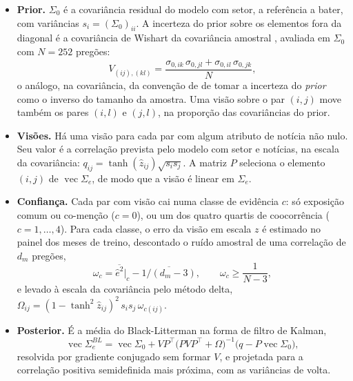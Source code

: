 \begin{itemize}
  \item \textbf{Prior.} $\Sigma_0$ é a covariância residual do modelo com setor, a referência a bater,
        com variâncias $s_i=(\Sigma_0)_{ii}$. A incerteza do prior sobre os elementos fora da diagonal é
        a covariância de Wishart da covariância amostral \citep{anderson2003}, avaliada em $\Sigma_0$
        com $N=252$ pregões:
        \begin{equation}
          V_{(ij),(kl)} = \frac{\sigma_{0,ik}\,\sigma_{0,jl} + \sigma_{0,il}\,\sigma_{0,jk}}{N},
          \label{eq:wishart}
        \end{equation}
        o análogo, na covariância, da convenção de \citet{he1999} de tomar a incerteza do \emph{prior}
        como o inverso do tamanho da amostra. Uma visão sobre o par $(i,j)$ move também os pares $(i,l)$
        e $(j,l)$, na proporção das covariâncias do prior.
  \item \textbf{Visões.} Há uma visão para cada par com algum atributo de notícia não nulo. Seu valor é a
        correlação prevista pelo modelo com setor e notícias, na escala da covariância:
        $q_{ij}=\tanh(\hat z_{ij})\sqrt{s_is_j}$. A matriz $P$ seleciona o elemento $(i,j)$ de
        $\operatorname{vec}\Sigma_e$, de modo que a visão é linear em $\Sigma_e$.
  \item \textbf{Confiança.} Cada par com visão cai numa classe de evidência $c$: só exposição comum ou
        co-menção ($c=0$), ou um dos quatro quartis de coocorrência ($c=1,\dots,4$). Para cada classe,
        o erro da visão em escala $z$ é estimado no painel dos meses de treino, descontado o ruído
        amostral de uma correlação de $d_m$ pregões,
        \begin{equation}
          \omega_c = \overline{\hat e^2}\big|_c - \overline{1/(d_m-3)},\qquad \omega_c\ge \frac{1}{N-3},
          \label{eq:omega}
        \end{equation}
        e levado à escala da covariância pelo método delta,
        $\Omega_{ij}=(1-\tanh^2\hat z_{ij})^2\,s_is_j\,\omega_{c(ij)}$.
  \item \textbf{Posterior.} É a média do Black-Litterman na forma de filtro de Kalman,
        \begin{equation}
          \operatorname{vec}\Sigma_e^{BL} = \operatorname{vec}\Sigma_0
          + VP^\top\bigl(PVP^\top+\Omega\bigr)^{-1}\bigl(q-P\operatorname{vec}\Sigma_0\bigr),
          \label{eq:bl}
        \end{equation}
        resolvida por gradiente conjugado sem formar $V$, e projetada para a correlação positiva
        semidefinida mais próxima, com as variâncias de volta.
\end{itemize}

